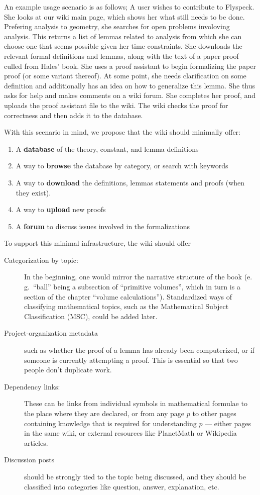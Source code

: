 An example usage scenario is as follows;  A user
wishes to contribute to Flyspeck.  She looks at our wiki main page,
which shows her what still needs to be done.  Prefering analysis to
geometry, she searches for open problems involoving analysis.  This
returns a list of lemmas related to analysis from which she can
choose one that seems possible given her time constraints. She
downloads the relevant formal definitions and lemmas, along with the
text of a paper proof culled from Hales' book.  She uses a proof
assistant to begin formalizing the paper proof (or some variant
thereof).  At some point, she needs clarification on some definition and additionally
has an idea on how to generalize this lemma.  She thus asks for help
and makes comments on a wiki forum.  She completes her proof, and
uploads the proof assistant file to the wiki.  The wiki checks the proof
for correctness and then adds it to the database.

With this scenario in mind, we propose that the wiki should minimally offer: 

\begin{enumerate} 
\item A \textbf{database} of the theory, constant, and lemma definitions 
\item A way to \textbf{browse} the database by category, or search with keywords 
\item A way to \textbf{download} the definitions, lemmas statements and proofs (when they exist). 
\item A way to \textbf{upload} new proofs 
\item A \textbf{forum} to discuss issues involved in the formalizations 
\end{enumerate} 

To support this minimal infrastructure, the wiki should offer 

\begin{description}
\item[Categorization by topic:] In the beginning, one would mirror the narrative structure
  of the book (e.\,g.\ ``ball'' being a subsection of ``primitive volumes'', which in turn
  is a section of the chapter ``volume calculations'').  Standardized ways of classifying
  mathematical topics, such as the Mathematical Subject Classification
  (MSC)\cite{AMS:MSC2000}, could be added later.
\item[Project-organization metadata] such as whether the proof
  of a lemma has already been computerized, or if someone is currently 
  attempting a proof.  This is essential so that two people don't duplicate
  work.
\item[Dependency links:] These can be links from individual symbols in mathematical
  formulae to the place where they are declared, or from any page $p$ to other pages
  containing knowledge that is required for understanding $p$ --- either pages in the same
  wiki, or external resources like PlanetMath or Wikipedia articles.
\item[Discussion posts] should be strongly tied to the topic being discussed, and they
  should be classified into categories like question, answer, explanation,
  etc.
\end{description}

